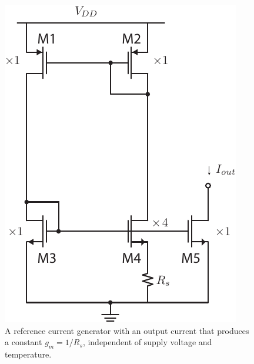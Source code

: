 \begin{figure}[tb]
\begin{center}
\includegraphics[scale=1]{constant_gm_bias.pdf}
\end{center}
\caption{A reference current generator with an output current that produces a constant $g_m = 1/R_s$, independent of supply voltage and temperature.} \label{fig:constant_gm_ref}
\end{figure}



